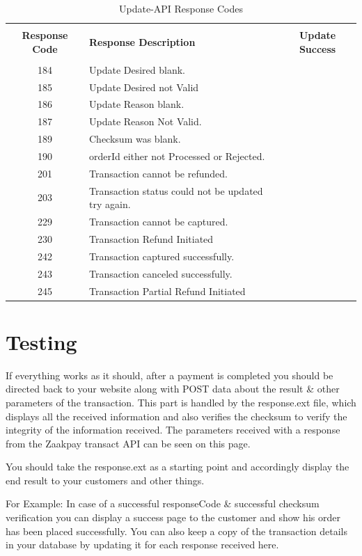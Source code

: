 \documentclass{article}
\newcommand{\cmark}{\ding{51}}
\newcommand{\xmark}{\ding{55}}
\begin{document}
\begin{longtable}{||c|p{10.5cm}||c||}
   \rowcolor{white}
   \caption{Update-API Response Codes}\\
   \rowcolor{green!50}
\bfseries{Response Code} & \bfseries{Response Description} & \bfseries{Update Success} \\ \hline & & \\
184 &Update Desired blank.& \textcolor{red} {\xmark} \\
185 &Update Desired not Valid& \textcolor{red} {\xmark} \\
186 &Update Reason blank.& \textcolor{red} {\xmark} \\
187 &Update Reason Not Valid.& \textcolor{red} {\xmark} \\
189 &Checksum was blank.& \textcolor{red} {\xmark} \\
190 &orderId either not Processed or Rejected.& \textcolor{red} {\xmark} \\
201 &Transaction cannot be refunded.& \textcolor{red} {\xmark} \\
203 &Transaction status could not be updated try again.& \textcolor{red} {\xmark} \\
229 &Transaction cannot be captured.& \textcolor{red} {\xmark} \\
230 &Transaction Refund Initiated&\textcolor{green} {\cmark}\\
242 &Transaction captured successfully.&\textcolor{green} {\cmark}\\
243 &Transaction canceled successfully.&\textcolor{green} {\cmark}\\
245 &Transaction Partial Refund Initiated&\textcolor{green} {\cmark}\\
\end{longtable}

\section{Testing}
If everything works as it should, after a payment is completed you should be directed back to your website along with POST data about the result \& other parameters of the transaction. This part is handled by the response.ext file, which displays all the received information and also verifies the checksum to verify the integrity of the information received. The parameters received with a response from the Zaakpay transact API can be seen on this page. 


You should take the response.ext as a starting point and accordingly display the end result to your customers and other things. 

For Example:
In case of a successful responseCode \& successful checksum verification you can display a success page to the customer and show his order has been placed successfully. You can also keep a copy of the transaction details in your database by updating it for each response received here.
\end{document}
